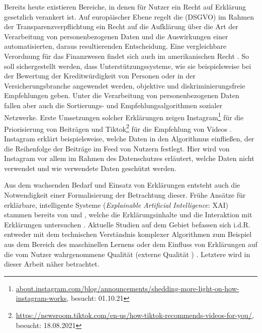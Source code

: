 Bereits heute existieren Bereiche, in denen für Nutzer ein \glqq Recht auf Erklärung\grqq{} gesetzlich verankert ist. Auf europäischer Ebene regelt die  (DSGVO) \cite{eu_verordnung_2016} im Rahmen der Transparenzverpflichtung ein Recht auf die Aufklärung über die Art der Verarbeitung von personenbezogenen Daten und die Auswirkungen einer automatisierten, daraus resultierenden Entscheidung. Eine vergleichbare Verordnung für das Finanzwesen findet sich auch im amerikanischen Recht \cite{cfpb_regulation_2018}. So soll sichergestellt werden, dass Unterstützungssysteme, wie sie beispielsweise bei der Bewertung der Kreditwürdigkeit von Personen oder in der Versicherungsbranche angewendet werden, objektive und diskriminierungsfreie Empfehlungen geben. Unter die Verarbeitung von personenbezogenen Daten fallen aber auch die Sortierungs- und Empfehlungsalgorithmen sozialer Netzwerke. Erste Umsetzungen solcher Erklärungen zeigen Instagram\footnote{\url{about.instagram.com/blog/announcements/shedding-more-light-on-how-instagram-works}, besucht: 01.10.21} für die Priorisierung von Beiträgen und Tiktok\footnote{\url{https://newsroom.tiktok.com/en-us/how-tiktok-recommends-videos-for-you/}, besucht: 18.08.2021} für die Empfehlung von Videos \cite{mosseri_shedding_2021,tiktok_technology_limited_how_2021}. Instagram erklärt beispielsweise, welche Daten in den Algorithmus einfließen, der die Reihenfolge der Beiträge im Feed von Nutzern festlegt. Hier wird von Instagram vor allem im Rahmen des Datenschutzes erläutert, welche Daten nicht verwendet und wie verwendete Daten geschützt werden.

Aus dem wachsenden Bedarf und Einsatz von Erklärungen entsteht auch die Notwendigkeit einer Formalisierung der Betrachtung dieser. Frühe Ansätze für erklärbare, intelligente Systeme (\textit{Explainable Artificial Intelligence}: XAI) stammen bereits von \citeauthor{byrne1991construction} und \citeauthor{cawsey1991generating}, welche die Erklärungsinhalte \cite{byrne1991construction} und die Interaktion mit Erklärungen untersuchen \cite{cawsey1991generating}. Aktuelle Studien auf dem Gebiet befassen sich i.d.R. entweder mit dem technischen Verständnis komplexer Algorithmen zum Beispiel aus dem Bereich des maschinellen Lernens \cite{gilpin_explaining_2018, fong_interpretable_2017, samek_towards_2019} oder dem Einfluss von Erklärungen auf die vom Nutzer wahrgenommene Qualität (externe Qualität \cite{international2011iso}) \cite{nunes_systematic_2017,kouki_user_2017,chazette_end-users_nodate}. Letztere wird in dieser Arbeit näher betrachtet.

